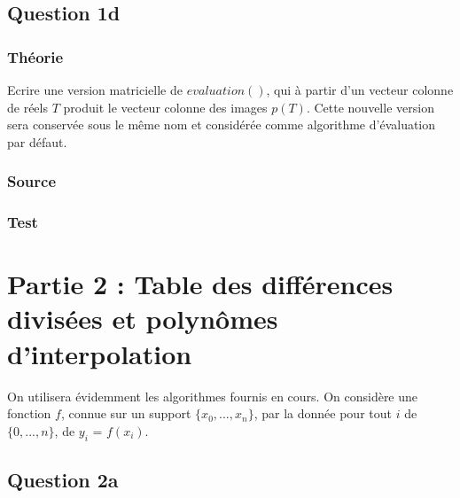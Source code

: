 \documentclass[a4paper,10pt]{report}
\begin{document}
\begin{center}
	
\end{center}

\section*{Question 1d}

\subsection*{Théorie}

Ecrire une version matricielle de $evaluation()$, qui à partir d’un vecteur
colonne de réels $T$ produit le vecteur colonne des images $p(T)$. Cette nouvelle
version sera conservée sous le même nom et considérée comme algorithme
d’évaluation par défaut.

\subsection*{Source}



\subsection*{Test}

\begin{center}
	
\end{center}

\chapter*{Partie 2 : Table des différences divisées et polynômes d’interpolation}

On utilisera évidemment les algorithmes fournis en cours. On considère une
fonction $f$, connue sur un support $\lbrace x_{0},...,x_{n}\rbrace$, par la donnée pour tout $i$ de $\lbrace 0,...,n \rbrace$, de $y_{i}$ = $f(x_{i})$.

\section*{Question 2a}
\end{document}
